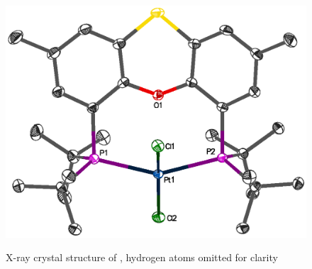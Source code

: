 \begin{figure}[htbp]
\begin{center}
\vspace{0.5cm}
\includegraphics[scale=0.8]{../Figures/Crystalthixantphosplatinumdichloride.eps}
\caption[X-ray crystal structure of \ce{[Pt(\tButhixantphos)Cl2]}]{X-ray crystal structure of \ce{[Pt(\tButhixantphos)Cl2]}, hydrogen atoms omitted for clarity}
\vspace{0.2cm}
\label{crystalthixantphosplatinumdichloride}
\end{center}
\end{figure}
\vspace{0.2cm}

